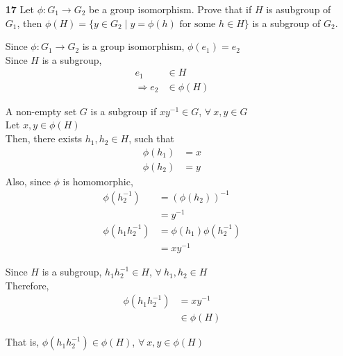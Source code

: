 \documentclass[paper=usletter, fontsize=12pt]{article}
\begin{document}
\begin{itemize}
\begin{itemize}
            \item[\textbf{17}] Let $\phi: G_1 \rightarrow G_2$ be a group
            isomorphism. Prove that if $H$ is asubgroup of $G_1$, then
            $\phi(H)=\{y\in G_2 \mid y = \phi(h) \text{ for some } h \in H\}$
            is a subgroup of $G_2$.
            \begin{cproof}

                Since $\phi:G_1 \rightarrow G_2$ is a group isomorphism,
                $\phi(e_1)=e_2$\\
                Since $H$ is a subgroup,
                \begin{align*}
                    e_1 & \in H\\
                    \Rightarrow e_2 & \in \phi(H)
                \end{align*}

                A non-empty set $G$ is a subgroup if $xy^{-1}\in G$, $\forall \
                x,y\in G$\\
                Let $x,y \in \phi(H)$\\
                Then, there exists $h_1,h_2 \in H$, such that
                \begin{align*}
                    \phi(h_1) & = x\\
                    \phi(h_2) & = y
                \end{align*}
                Also, since $\phi$ is homomorphic,
                \begin{align*}
                    \phi(h_2^{-1}) & = (\phi(h_2))^{-1}\\
                    & = y^{-1}\\
                    \phi(h_1h_2^{-1}) & = \phi(h_1)\phi(h_2^{-1})\\
                    & = xy^{-1}
                \end{align*}

                Since $H$ is a subgroup, $h_1h_2^{-1}\in H$, $\forall \ h_1,h_2
                \in H$\\
                Therefore,
                \begin{align*}
                    \phi(h_1h_2^{-1}) & = xy^{-1}\\
                    & \in \phi(H)
                \end{align*}

                That is, $\phi(h_1h_2^{-1}) \in \phi(H)$, $\forall \ x,y \in
                \phi(H)$ \qedhere

            \end{cproof}

        \end{itemize}

    \end{itemize}
\end{document}
